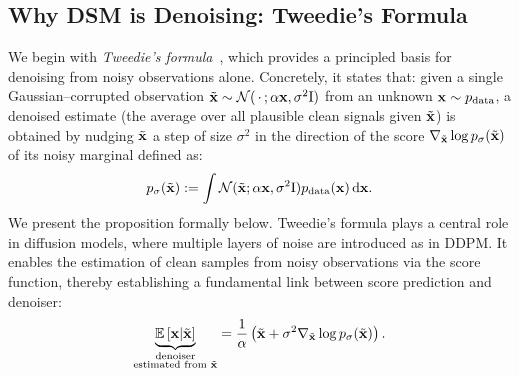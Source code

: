 \subsection{Why DSM is Denoising: Tweedie's Formula}\label{subsec:why-dsm-denoising-tweedie}

We begin with \emph{Tweedie's formula}~\citep{efron2011tweedie}, which provides a principled basis for denoising from noisy observations alone.
Concretely, it states that: given a single Gaussian–corrupted observation $\tilde{{\mathbf{x}}}\sim\mathcal N(\,\cdot\,;\alpha{\mathbf{x}},\sigma^2\mathrm{I})$  from an unknown ${\mathbf{x}} \sim p_{\mathrm{data}}$, a denoised estimate (the
average over all plausible clean signals given $\tilde{{\mathbf{x}}}$) is obtained by nudging
$\tilde{{\mathbf{x}}}$ a step of size $\sigma^2$ in the direction of the score
$\nabla_{\tilde{{\mathbf{x}}}}\log p_\sigma(\tilde{{\mathbf{x}}})$ of its noisy marginal defined as:
\[
p_\sigma(\tilde{{\mathbf{x}}}):= \int \mathcal{N}(\tilde{{\mathbf{x}}};\alpha {\mathbf{x}},\sigma^2\mathrm{I})p_{\mathrm{data}}({\mathbf{x}})\mathop{}\!\mathrm{d}{\mathbf{x}}.
\]
We present the proposition formally below.
Tweedie’s formula plays a central role in diffusion models, where multiple layers of noise are introduced as in DDPM. 
It enables the estimation of clean samples from noisy observations via the score function, thereby establishing a fundamental link between score prediction and denoiser:
\begin{equation*}
\underbrace{\mathbb{E} \left[{\mathbf{x}}|\tilde{{\mathbf{x}}}\right]}_{\substack{\text{denoiser}\\\text{estimated from }\tilde{{\mathbf{x}}}}}
= \frac{1}{\alpha}\left(\tilde{{\mathbf{x}}} + \sigma^2 \nabla_{\tilde{{\mathbf{x}}}} \log p_\sigma(\tilde{{\mathbf{x}}})\right).
\end{equation*}

